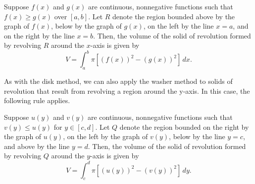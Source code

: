 \documentclass{report}
\begin{document}
    \pagebreak \bigbreak \noindent 
    \begin{thrm}
       Suppose \( f(x) \) and \( g(x) \) are continuous, nonnegative functions such that \( f(x) \geq g(x) \) over \([a, b]\). Let \( R \) denote the region bounded above by the graph of \( f(x) \), below by the graph of \( g(x) \), on the left by the line \( x = a \), and on the right by the line \( x = b \). Then, the volume of the solid of revolution formed by revolving \( R \) around the \( x \)-axis is given by
        \[
        V = \int_{a}^{b} \pi \left[ (f(x))^2 - (g(x))^2 \right] \, dx.
        \] 
    \end{thrm}
    \bigbreak \noindent \bigbreak \noindent 
    As with the disk method, we can also apply the washer method to solids of revolution that result from revolving a region around the y-axis. In this case, the following rule applies.
    \bigbreak \noindent \bigbreak \noindent 
    \begin{thrm}
        Suppose \( u(y) \) and \( v(y) \) are continuous, nonnegative functions such that \( v(y) \leq u(y) \) for \( y \in [c, d] \). Let \( Q \) denote the region bounded on the right by the graph of \( u(y) \), on the left by the graph of \( v(y) \), below by the line \( y = c \), and above by the line \( y = d \). Then, the volume of the solid of revolution formed by revolving \( Q \) around the \( y \)-axis is given by
        \[
        V = \int_{c}^{d} \pi \left[ (u(y))^2 - (v(y))^2 \right] \, dy.
        \]
    \end{thrm}
\end{document}
